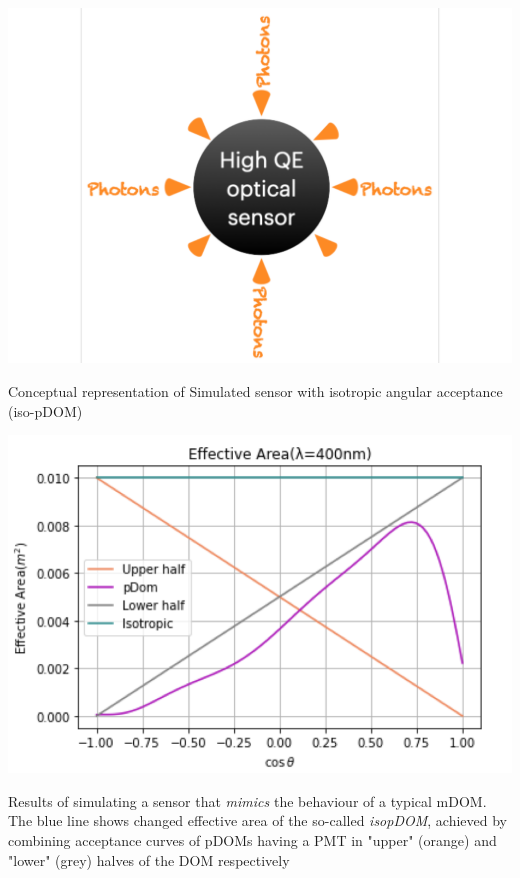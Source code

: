 \begin{marginfigure}
    \includegraphics{./figures/gen2/iso-pDOM.pdf}
    \caption[Schematic of an isoPDOM]{Conceptual representation of Simulated sensor with isotropic angular acceptance (iso-pDOM)}
\end{marginfigure}

\begin{marginfigure}
    \includegraphics{./figures/gen2/isopDOM_eff_area.png}
    \caption[Effective area of isoPDOM]{Results of simulating a sensor that \emph{mimics} the behaviour of a typical mDOM. The blue line shows changed effective area of the so-called \emph{isopDOM}, achieved by combining acceptance curves of pDOMs having a PMT in "upper" (orange) and "lower" (grey) halves of the DOM respectively}
\end{marginfigure}


